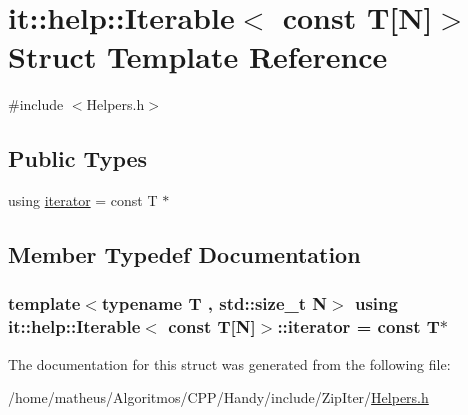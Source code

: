 \hypertarget{structit_1_1help_1_1Iterable_3_01const_01T[N]_4}{}\section{it\+:\+:help\+:\+:Iterable$<$ const T\mbox{[}N\mbox{]}$>$ Struct Template Reference}
\label{structit_1_1help_1_1Iterable_3_01const_01T[N]_4}


{\ttfamily \#include $<$Helpers.\+h$>$}

\subsection*{Public Types}
\begin{DoxyCompactItemize}
\item 
using \hyperlink{structit_1_1help_1_1Iterable_3_01const_01T[N]_4_ab130f7ca6f5e168697eee8ba64273278}{iterator} = const T $\ast$
\end{DoxyCompactItemize}


\subsection{Member Typedef Documentation}
\subsubsection[{\texorpdfstring{iterator}{iterator}}]{\setlength{\rightskip}{0pt plus 5cm}template$<$typename T , std\+::size\+\_\+t N$>$ using {\bf it\+::help\+::\+Iterable}$<$ const T\mbox{[}N\mbox{]}$>$\+::{\bf iterator} =  const T$\ast$}\hypertarget{structit_1_1help_1_1Iterable_3_01const_01T[N]_4_ab130f7ca6f5e168697eee8ba64273278}{}\label{structit_1_1help_1_1Iterable_3_01const_01T[N]_4_ab130f7ca6f5e168697eee8ba64273278}


The documentation for this struct was generated from the following file\+:\begin{DoxyCompactItemize}
\item 
/home/matheus/\+Algoritmos/\+C\+P\+P/\+Handy/include/\+Zip\+Iter/\hyperlink{ZipIter_2Helpers_8h}{Helpers.\+h}\end{DoxyCompactItemize}
